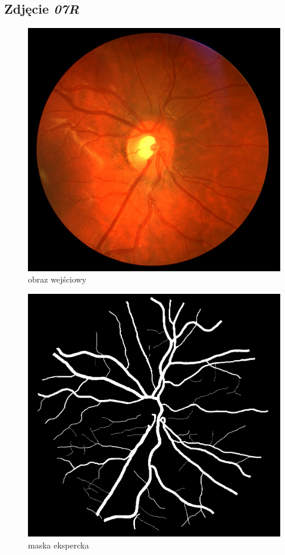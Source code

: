 \documentclass[polish,polish,a4paper]{article}
\begin{document}






		\subsection{Zdjęcie \textit{07R}}
		
\begin{figure}[!h]
	\centering
	\begin{minipage}{0.26\linewidth}
		\includegraphics[width=\linewidth]{../chase/Image_07R.jpg}
		\centering
			\small{obraz wejściowy}
	\end{minipage}
	\hfill
	\begin{minipage}{0.26\linewidth}
		\includegraphics[width=\linewidth]{../chase/Image_07R_1stHO.png}
		\centering
			\small{maska ekspercka}
	\end{minipage}
\end{figure}
\end{document}
